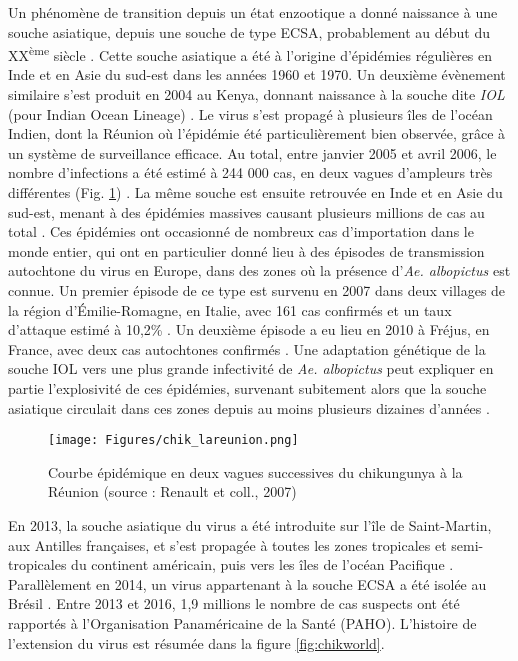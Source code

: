 Un phénomène de transition depuis un état enzootique a donné naissance à une souche asiatique, depuis une souche de type ECSA, probablement au début du XX\textsuperscript{ème} siècle \cite{volk2010genome}.
Cette souche asiatique a été à l'origine d'épidémies régulières en Inde et en Asie du sud-est dans les années 1960 et 1970.
Un deuxième évènement similaire s'est produit en 2004 au Kenya, donnant naissance à la souche dite \textit{IOL} (pour \guillemotleft Indian Ocean Lineage\guillemotright) \cite{chretien2007drought}. 
Le virus s'est propagé à plusieurs îles de l'océan Indien, dont la Réunion où l'épidémie été particulièrement bien observée, grâce à un système de surveillance efficace.
Au total, entre janvier 2005 et avril 2006, le nombre d'infections a été estimé à 244 000 cas, en deux vagues d'ampleurs très différentes (Fig. \ref{fig:chiklareuion}) \cite{renault2007major}.
La même souche est ensuite retrouvée en Inde et en Asie du sud-est, menant à des épidémies massives causant plusieurs millions de cas au total \cite{arankalle2007genetic}.
Ces épidémies ont occasionné de nombreux cas d'importation dans le monde entier, qui ont en particulier donné lieu à des épisodes de transmission autochtone du virus en Europe, dans des zones où la présence d'{\em Ae. albopictus} est connue.
Un premier épisode de ce type est survenu en 2007 dans deux villages de la région d'\'Emilie-Romagne, en Italie, avec 161 cas confirmés et un taux d'attaque estimé à 10,2\% \cite{poletti2011transmission}.
Un deuxième épisode a eu lieu en 2010 à Fréjus, en France, avec deux cas autochtones confirmés \cite{grandadam2011chikungunya}.
Une adaptation génétique de la souche IOL vers une plus grande infectivité de {\em Ae. albopictus} peut expliquer en partie l'explosivité de ces épidémies, survenant subitement alors que la souche asiatique circulait dans ces zones depuis au moins plusieurs dizaines d'années \cite{arankalle2007genetic,tsetsarkin2007single,tsetsarkin2011chikungunya}.
\begin{figure}[t]
	\centering
	\texttt{[image: Figures/chik\_lareunion.png]}
	\caption{Courbe épidémique en deux vagues successives du chikungunya à la Réunion (source : Renault et coll., 2007)}
	\label{fig:chiklareuion}
\end{figure}

En 2013, la souche asiatique du virus a été introduite sur l'île de Saint-Martin, aux Antilles françaises, et s'est propagée à toutes les zones tropicales et semi-tropicales du continent américain, puis vers les îles de l'océan Pacifique \cite{leparc2014chikungunya}.
Parallèlement en 2014, un virus appartenant à la souche ECSA a été isolée au Brésil \cite{nunes2015emergence}.
Entre 2013 et 2016, 1,9 millions le nombre de cas suspects ont été rapportés à l'Organisation Panaméricaine de la Santé (PAHO).
L'histoire de l'extension du virus est résumée dans la figure \ref{fig:chikworld}.

